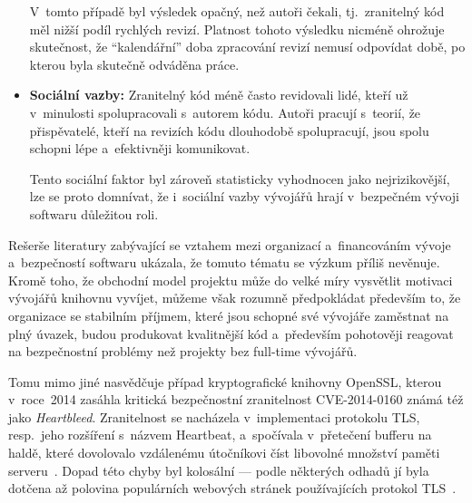 \begin{itemize}
        V~tomto případě byl výsledek opačný, než autoři čekali, tj.\ zranitelný kód měl nižší podíl rychlých revizí. Platnost tohoto výsledku nicméně ohrožuje skutečnost, že ``kalendářní'' doba zpracování revizí nemusí odpovídat době, po kterou byla skutečně odváděna práce.

    \item \textbf{Sociální vazby:} \enskip
        Zranitelný kód méně často revidovali lidé, kteří už v~minulosti spolupracovali s~autorem kódu. Autoři pracují s~teorií, že přispěvatelé, kteří na revizích kódu dlouhodobě spolupracují, jsou spolu schopni lépe a~efektivněji komunikovat.

        Tento sociální faktor byl zároveň statisticky vyhodnocen jako nejrizikovější, lze se proto domnívat, že i~sociální vazby vývojářů hrají v~bezpečném vývoji softwaru důležitou roli.
\end{itemize}

Rešerše literatury zabývající se vztahem mezi organizací a~financováním vývoje a~bezpečností softwaru ukázala, že tomuto tématu se výzkum příliš nevěnuje. Kromě toho, že obchodní model projektu může do velké míry vysvětlit motivaci vývojářů knihovnu vyvíjet, můžeme však rozumně předpokládat především to, že organizace se stabilním příjmem, které jsou schopné své vývojáře zaměstnat na plný úvazek, budou produkovat kvalitnější kód a~především pohotověji reagovat na bezpečnostní problémy než projekty bez full-time vývojářů.

Tomu mimo jiné nasvědčuje případ kryptografické knihovny OpenSSL, kterou v~roce~2014 zasáhla kritická bezpečnostní zranitelnost CVE-2014-0160 známá též jako \emph{Heartbleed}. Zranitelnost se nacházela v~implementaci protokolu TLS, resp.\ jeho rozšíření s~názvem Heartbeat, a~spočívala v~přetečení bufferu na haldě, které dovolovalo vzdálenému útočníkovi číst libovolné množství paměti serveru~\cite{heartbleed}. Dopad této chyby byl kolosální --- podle některých odhadů jí byla dotčena až polovina populárních webových stránek používajících protokol TLS~\cite{durumeric2014matter}.

